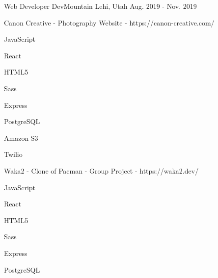 

\begin{cventries}

  \cventry
    {Web Developer} %
    {DevMountain} %
    {Lehi, Utah} %
    {Aug. 2019 - Nov. 2019} %
    {
      \begin{cvitems} %
        \item{Canon Creative - Photography Website - https://canon-creative.com/}
        \begin{cvitems}
          \begin{multicols}{2}
          \item {JavaScript}
          \item {React}
          \item {HTML5}
          \item {Sass}
          \item {Express}
          \item {PostgreSQL}
          \item {Amazon S3}
          \item {Twilio}
          \end{multicols}
        \end{cvitems}
        \item {Waka2 - Clone of Pacman - Group Project - https://waka2.dev/}
        \begin{cvitems}
          \begin{multicols}{2}
          \item {JavaScript}
          \item {React}
          \item {HTML5}
          \item {Sass}
          \item {Express}
          \item {PostgreSQL}
          \end{multicols}
        \end{cvitems}
      \end{cvitems}
    }


\end{cventries}
